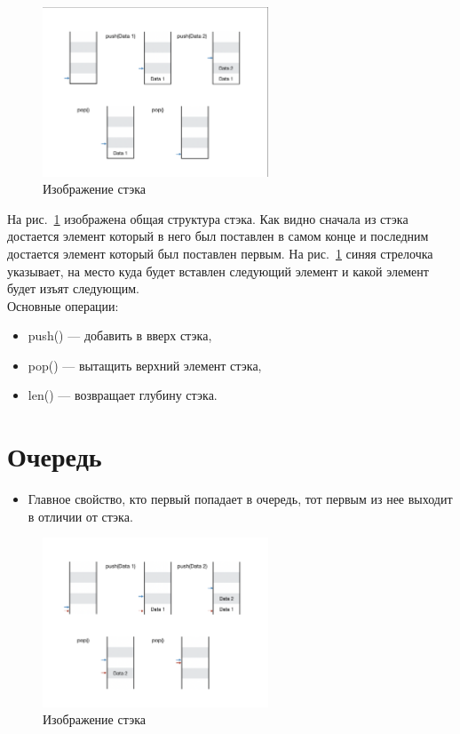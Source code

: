 \documentclass[12pt, twoside]{article}
\begin{document}
\begin{figure}[h!t]\center
\includegraphics[width=0.6\textwidth]{Lecture_4_Stek.jpg}
\caption{Изображение стэка}
\label{Lecture_4_Stek}
\end{figure}

На рис.~\ref{Lecture_4_Stek} изображена общая структура стэка. Как видно сначала из стэка достается элемент который в него был поставлен в самом конце и последним достается элемент который был поставлен первым. На рис.~\ref{Lecture_4_Stek}  синяя стрелочка указывает, на место куда будет вставлен следующий элемент и какой элемент будет изъят следующим.\\

Основные операции:
\begin{itemize}
	\item push() --- добавить в вверх стэка,
	\item pop()  --- вытащить верхний элемент стэка,
	\item len() --- возвращает глубину стэка.
\end{itemize}

\section{Очередь}
\begin{itemize}
	\item Главное свойство, кто первый попадает в очередь, тот первым из нее выходит в отличии от стэка.
\end{itemize}


\begin{figure}[h!t]\center
\includegraphics[width=0.6\textwidth]{Lecture_4_Queue.jpg}
\caption{Изображение стэка}
\label{Lecture_4_Queue}
\end{figure}
\end{document}
